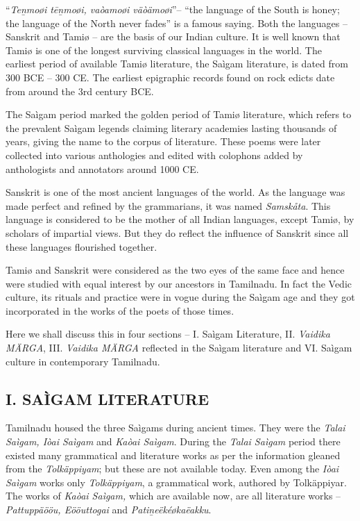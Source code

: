 “\textit{Teṉmoøi tēṉmoøi, vaòamoøi väòämoøi}”– “the language of the South is honey; the language of the North never fades” is a famous saying. Both the languages – Sanskrit and Tamiø – are the basis of our Indian culture. It is well known that Tamiø is one of the longest surviving classical languages in the world. The earliest period of available Tamiø literature, the Saìgam literature, is dated from 300 BCE – 300 CE. The earliest epigraphic records found on rock edicts date from around the 3rd century BCE.

The Saìgam period marked the golden period of Tamiø literature, which refers to the prevalent Saìgam legends claiming literary academies lasting thousands of years, giving the name to the corpus of literature. These poems were later collected into various anthologies and edited with colophons added by anthologists and annotators around 1000 CE.

Sanskrit is one of the most ancient languages of the world. As the language was made perfect and refined by the grammarians, it was named \textit{Samskåta}. This language is considered to be the mother of all Indian languages, except Tamiø, by scholars of impartial views. But they do reflect the influence of Sanskrit since all these languages flourished together.

Tamiø and Sanskrit were considered as the two eyes of the same face and hence were studied with equal interest by our ancestors in Tamilnadu. In fact the Vedic culture, its rituals and practice were in vogue during the Saìgam age and they got incorporated in the works of the poets of those times.

Here we shall discuss this in four sections – I. Saìgam Literature, II. \textit{Vaidika MÄRGA}, III. \textit{Vaidika MÄRGA} reflected in the Saìgam literature and VI. Saìgam culture in contemporary Tamilnadu.

\subsection*{I. SAÌGAM LITERATURE}

Tamilnadu housed the three Saìgams during ancient times. They were the \textit{Talai Saìgam, Iòai Saìgam} and \textit{Kaòai Saìgam}. During the \textit{Talai Saìgam} period there existed many grammatical and literature works as per the information gleaned from the \textit{Tolkäppiyam}; but these are not available today. Even among the \textit{Iòai Saìgam} works only \textit{Tolkäppiyam}, a grammatical work, authored by Tolkäppiyar. The works of \textit{Kaòai Saìgam,} which are available now, are all literature works – \textit{Pattuppäööu, Eööuttogai} and \textit{Patiṉeëkéøkaëakku}.

